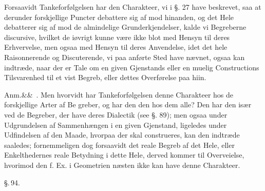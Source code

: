\documentclass[12pt]{book}
\def\sperr#1{#1}%
\def\textit#1{#1}%
\def\emph#1{#1}%
\newcommand{\sperr}[1]{\textls[180]{#1}}
\newcommand{\parag}[1]{%
  \par\vspace{0.9\baselineskip}%
  {\centering\textit{\S.\,#1.}\par}%
  \vspace{0.35\baselineskip}%
  \noindent\hspace{\parindent}\ignorespaces
}
\newcommand{\anm}[1]{%
  \par\vspace{0.5\baselineskip}%
  \noindent\hspace{\parindent}\sperr{Anm.}\ifx&#1&\else~\textit{#1}.\fi
  \enspace\ignorespaces
}
\newcommand{\opage}[1]{\marginnote{\footnotesize\textit{[#1]}}}
\begin{document}
Forsaavidt Tankeforfølgelsen har den Charakteer, vi i §. 27 have beskrevet, saa at
derunder forskjellige Puncter debattere sig af mod hinanden, og det Hele debatterer sig
af mod de almindelige Grunderkjendelser, kalde vi Begreberne \emph{discursive}, hvilket
de iøvrigt kunne være ikke blot med Hensyn til deres Erhvervelse, men ogsaa med Hensyn
til deres Anvendelse, idet det hele Raisonnerende og Discuterende, vi paa anførte Sted
have nævnet, ogsaa kan indtræde, naar der er Tale om en given Gjenstands eller en
muelig Constructions Tilsvarenhed til et vist Begreb, eller dettes Overførelse paa hiin.

\anm{} Men hvorvidt har Tankeforfølgelsen denne Charakteer hos de forskjellige Arter af
Be%
\opage{236}greber, og har den den hos dem alle? Den har den især ved de Begreber, der have deres
Dialectik (see §. 89); men ogsaa under Udgrundelsen af Sammenhængen i en given
Gjenstand, ligeledes under Udfindelsen af den Maade, hvorpaa der skal construeres, kan
den indtræde saaledes; fornemmeligen dog forsaavidt det reale Begreb af det Hele, eller
Enkelthedernes reale Betydning i dette Hele, derved kommer til Overveielse, hvorimod
den f. Ex. i Geometrien næsten ikke kan have denne Charakteer.

\parag{94}
\end{document}
